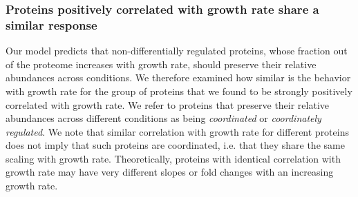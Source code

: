 \subsubsection{Proteins positively correlated with growth rate share a similar response}
\label{propchange} 
Our model predicts that non-differentially regulated proteins, whose fraction out of the proteome increases with growth rate, should preserve their relative abundances across conditions.
We therefore examined how similar is the behavior with growth rate for the group of proteins that we found  to be strongly positively correlated with growth rate.
We refer to proteins that preserve their relative abundances across different conditions as being \emph{coordinated} or \emph{coordinately regulated}.
We note that similar correlation with growth rate for different proteins does not imply that such proteins are coordinated, i.e. that they share the same scaling with growth rate.
Theoretically, proteins with identical correlation with growth rate may have very different slopes or fold changes with an increasing growth rate.